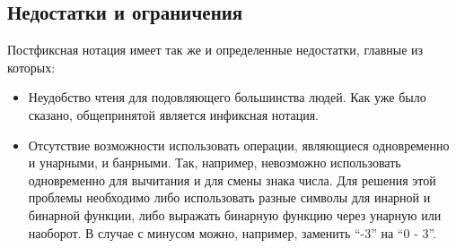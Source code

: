 \documentclass[12pt, a4paper]{article}
\begin{document}
	\subsection{Недостатки и ограничения}
	Постфиксная нотация имеет так же и определенные недостатки, главные из которых:
	\begin{itemize}
		\item Неудобство чтеня для подовляющего большинства людей. Как уже было сказано,
			общепринятой является инфиксная нотация.
		\item Отсутствие возможности использовать операции, являющиеся одновременно и унарными,
			и банрными. Так, например, невозможно использовать одновременно для вычитания и для 
			смены знака числа. Для решения этой проблемы необходимо либо использовать разные 
			символы для инарной и бинарной функции, либо выражать бинарную функцию через унарную
			или наоборот. В случае с минусом можно, например, заменить ``-3'' на ``0 - 3''.
	\end{itemize}
\end{document}
